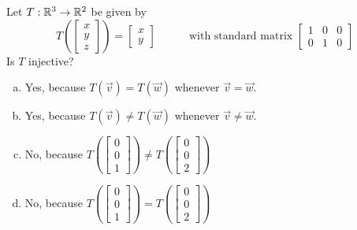 \begin{activity}{3}
Let \(T: \mathbb{R}^3 \rightarrow \mathbb{R}^2\) be given by
\[
  T\left(\begin{bmatrix}x \\ y\\z \end{bmatrix} \right)
    =
  \begin{bmatrix} x \\ y \end{bmatrix}
    \hspace{3em}
    \text{with standard matrix }
  \begin{bmatrix} 1 & 0 & 0 \\ 0 & 1 & 0 \end{bmatrix}
\]
Is \(T\) injective?
\begin{enumerate}[a)]
\item Yes, because \(T(\vec v)=T(\vec w)\) whenever \(\vec v=\vec w\).
\item Yes, because \(T(\vec v)\not=T(\vec w)\) whenever \(\vec v\not=\vec w\).
\item No, because 
  \(
    T\left(\begin{bmatrix}0\\0\\1\end{bmatrix}\right)
      \not=
    T\left(\begin{bmatrix}0\\0\\2\end{bmatrix}\right)
  \)
\item No, because 
  \(
    T\left(\begin{bmatrix}0\\0\\1\end{bmatrix}\right)
      =
    T\left(\begin{bmatrix}0\\0\\2\end{bmatrix}\right)
  \)
\end{enumerate}
\end{activity}

